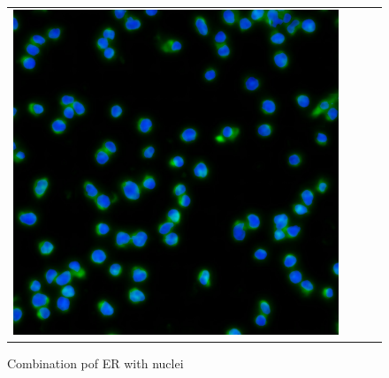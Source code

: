 \begin{figure}[htb]
\begin{tabularx}{\textwidth}{YYYY}
            \includegraphics{bilder/ER/gt_nuclei.jpg}
        \end{tabularx}
    \caption{Combination pof ER with nuclei}
    \label{fig:er-combined}
\end{figure}